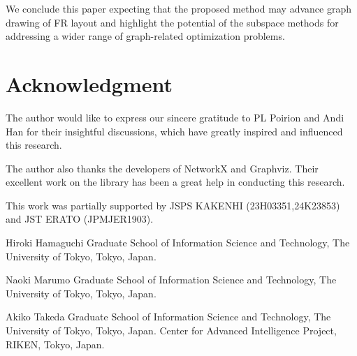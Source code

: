 \documentclass[dvipdfmx,10pt,journal,compsoc]{IEEEtran}
\begin{document}
We conclude this paper expecting that the proposed method may advance graph drawing of FR layout and highlight the potential of the subspace methods for addressing a wider range of graph-related optimization problems.

\section{Acknowledgment}

The author would like to express our sincere gratitude to PL Poirion and Andi Han for their insightful discussions, which have greatly inspired and influenced this research.

The author also thanks the developers of NetworkX and Graphviz. Their excellent work on the library has been a great help in conducting this research.

This work was partially supported by JSPS KAKENHI (23H03351,24K23853) and JST ERATO (JPMJER1903).



\begin{IEEEbiographynophoto}{Hiroki Hamaguchi}
  Graduate School of Information Science and Technology, The University of Tokyo, Tokyo, Japan.
\end{IEEEbiographynophoto}
\begin{IEEEbiographynophoto}{Naoki Marumo}
  Graduate School of Information Science and Technology, The University of Tokyo, Tokyo, Japan.
\end{IEEEbiographynophoto}
\begin{IEEEbiographynophoto}{Akiko Takeda}
  Graduate School of Information Science and Technology, The University of Tokyo, Tokyo, Japan.
  Center for Advanced Intelligence Project, RIKEN, Tokyo, Japan.
\end{IEEEbiographynophoto}
\end{document}
